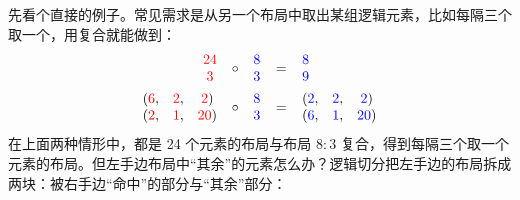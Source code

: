 先看个直接的例子。常见需求是从另一个布局中取出某组逻辑元素，比如每隔三个取一个，用复合就能做到：
\begin{align*}
\begin{array}{c} \textcolor{red}{24} \\ \textcolor{red}{3} \end{array}
\ \circ \
\begin{array}{c} \textcolor{blue}{8} \\ \textcolor{blue}{3} \end{array}
\ &= \
\begin{array}{c} \textcolor{blue}{8} \\ \textcolor{blue}{9} \end{array} \\
\begin{array}{ccc} (\textcolor{red}{6}, & \textcolor{red}{2}, & \textcolor{red}{2}) \\ (\textcolor{red}{2}, & \textcolor{red}{1}, & \textcolor{red}{20}) \end{array}
\ \circ \
\begin{array}{c} \textcolor{blue}{8} \\ \textcolor{blue}{3} \end{array}
\ &= \
\begin{array}{ccc} (\textcolor{blue}{2}, & \textcolor{blue}{2}, & \textcolor{blue}{2}) \\ (\textcolor{blue}{6}, & \textcolor{blue}{1}, & \textcolor{blue}{20}) \end{array}
\end{align*}
在上面两种情形中，都是 24 个元素的布局与布局 $8:3$ 复合，得到每隔三个取一个元素的布局。但左手边布局中“其余”的元素怎么办？逻辑切分把左手边的布局拆成两块：被右手边“命中”的部分与“其余”部分：
